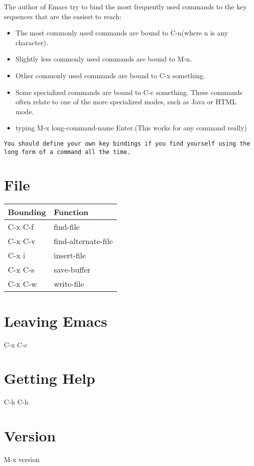 \documentclass{book}
\newcommand{\head}[1]{\textnormal{\textbf{#1}}}
\begin{document}
The author of Emacs try to bind the most frequently used commands to the key sequences that are the easiest to reach:
\begin{itemize}
\item The most commonly used commands are bound to C-n(where n is any character).
\item Slightly less commonly used commands are bound to M-n.
\item Other commonly used commands are bound to C-x something.
\item Some specialized commands are bound to C-c something. These commands often relate to one of the more specialized modes, such as Java or HTML mode.
\item typing M-x long-command-name Enter.(This works for any command really)
\end{itemize}

\begin{verbatim}
You should define your own key bindings if you find yourself using the long form of a command all the time.
\end{verbatim}

\section{File}

\begin{tabular}{ll}
  \toprule[1.5pt]
  \head{Bounding} & \head{Function} \\
  \midrule
  C-x C-f & find-file \\
  C-x C-v & find-alternate-file \\
  C-x i & insert-file \\
  C-x C-s & save-buffer \\
  C-x C-w & write-file \\
  \bottomrule[1.5pt]
\end{tabular}

\section{Leaving Emacs}
C-x C-c

\section{Getting Help}
C-h C-h

\section{Version}
M-x version 
\end{document}
